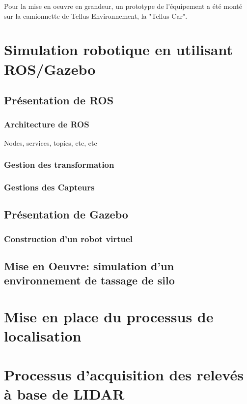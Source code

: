 \documentclass[12pt,a4paper]{report}
\begin{document}
				Pour la mise en oeuvre en grandeur, un prototype de l'équipement a été monté sur la camionnette de Tellus Environnement, la "Tellus Car".
				

\chapter{Simulation robotique en utilisant ROS/Gazebo}
	\section{Présentation de ROS}
		\subsection{Architecture de ROS}
			Nodes, services, topics, etc, etc
		\subsection{Gestion des transformation}
		\subsection{Gestions des Capteurs}
	\section{Présentation de Gazebo}
		\subsection{Construction d'un robot virtuel}
	\section{Mise en Oeuvre: simulation d'un environnement de tassage de silo}

\chapter{Mise en place du processus de localisation}

\chapter{Processus d'acquisition des relevés à base de LIDAR}
\end{document}
